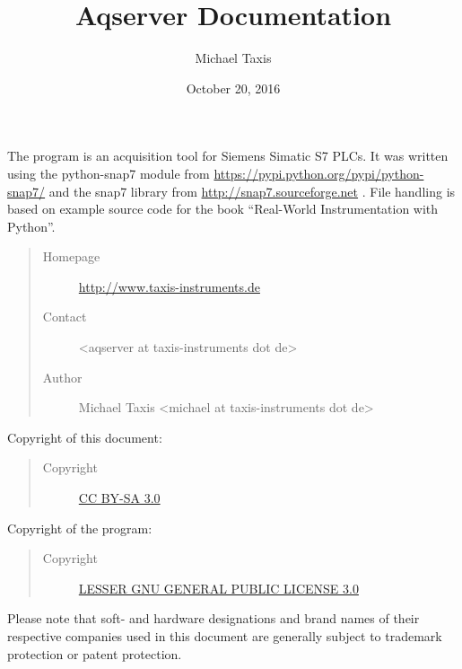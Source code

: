 \documentclass[a4paper,10pt,english]{sphinxmanual}
\title{Aqserver Documentation}
\date{October 20, 2016}
\author{Michael Taxis}
\begin{document}
\maketitle
\tableofcontents
{}\label{index::doc}


The program is an acquisition tool for Siemens Simatic S7 PLCs.
It was written using the python-snap7 module from \href{https://pypi.python.org/pypi/python-snap7/}{https://pypi.python.org/pypi/python-snap7/} and the snap7 library from \href{http://snap7.sourceforge.net}{http://snap7.sourceforge.net} .
File handling is based on example source code for the book ``Real-World Instrumentation with Python''.
\begin{quote}\begin{description}
\item[{Homepage}] \leavevmode
\href{http://www.taxis-instruments.de}{http://www.taxis-instruments.de}

\item[{Contact}] \leavevmode
\textless{}aqserver at taxis-instruments dot de\textgreater{}

\item[{Author}] \leavevmode
Michael Taxis \textless{}michael at taxis-instruments dot de\textgreater{}

\end{description}\end{quote}

Copyright of this document:
\begin{quote}\begin{description}
\item[{Copyright}] \leavevmode
\href{http://creativecommons.org/licenses/by-sa/3.0/}{CC BY-SA 3.0}

\end{description}\end{quote}

Copyright of the program:
\begin{quote}\begin{description}
\item[{Copyright}] \leavevmode
\href{https://www.gnu.org/licenses/lgpl-3.0-standalone.html}{LESSER GNU GENERAL PUBLIC LICENSE 3.0}

\end{description}\end{quote}

Please note that soft- and hardware designations and brand names of their respective companies  used in this document are  generally subject to trademark protection or patent protection.
\end{document}

